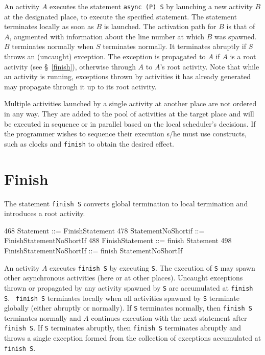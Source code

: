 An activity $A$ executes the statement {\tt async (P) S} by launching
a new activity $B$ at the designated place, to execute the specified
statement. The statement terminates locally as soon as $B$ is
launched.  The activation path for $B$ is that of $A$, augmented with
information about the line number at which $B$ was spawned.  $B$
terminates normally when $S$ terminates normally.  It terminates
abruptly if $S$ throws an (uncaught) exception. The exception is
propagated to $A$ if $A$ is a root activity (see \S~\ref{finish}),
otherwise through $A$ to $A$'s root activity. Note that while an
activity is running, exceptions thrown by activities it has already
generated may propagate through it up to its root activity.

Multiple activities launched by a single activity at another place
are not ordered in any way. They are added to the pool of activities
at the target place and will be executed in sequence or in parallel
based on the local scheduler's decisions. If the programmer wishes
to sequence their execution s/he must use \Xten{} constructs,
such as clocks and {\tt finish} to obtain the desired effect.

\section{Finish}\label{finish}
The statement {\tt finish S} converts global termination to local
termination and introduces a root activity. 
\begin{x10}
468 Statement ::= FinishStatement
478 StatementNoShortif ::= 
      FinishStatementNoShortIf
488 FinishStatement ::= finish Statement
498 FinishStatementNoShortIf ::= 
      finish StatementNoShortIf
\end{x10}

An activity $A$ executes {\tt finish S} by executing {\tt S}.  The
execution of {\tt S} may spawn other asynchronous activities (here or
at other places).  Uncaught exceptions thrown or propagated by any
activity spawned by {\tt S} are accumulated at {\tt finish S}.  {\tt
finish S} terminates locally when all activities spawned by {\tt S}
terminate globally (either abruptly or normally). If
{\tt S} terminates normally, then {\tt finish S} terminates normally
and $A$ continues execution with the next statement after {\tt finish S}.
If {\tt S} terminates abruptly, then {\tt finish S}
terminates abruptly and throws a single exception formed 
from the collection of exceptions accumulated at {\tt finish S}.


